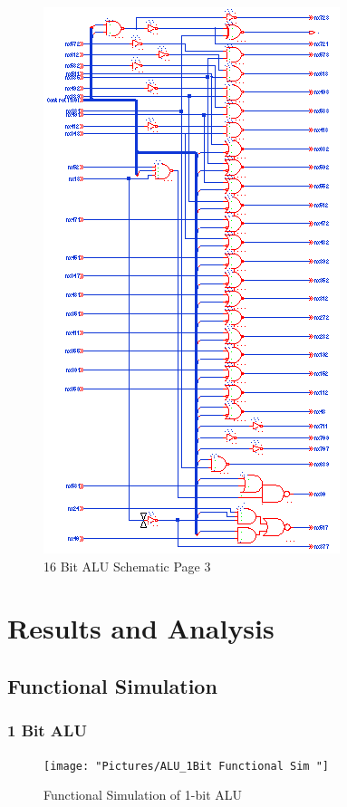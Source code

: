 \documentclass[11pt]{article}
\begin{document}
		\begin{figure}[H]
			\centering
			\includegraphics[width=0.7\linewidth]{"Pictures/ALU-16Bit Schematic 3"}
			\caption{16 Bit ALU Schematic Page 3}
			\label{fig:alu-16bit-schematic-3}
		\end{figure}


\section{Results and Analysis}

	\subsection{Functional Simulation}
	
		\subsubsection{1 Bit ALU}
		
			\begin{figure}[H]
				\centering
				\texttt{[image: "Pictures/ALU\_1Bit Functional Sim "]}
				\caption{Functional Simulation of 1-bit ALU}
				\label{fig:alu1bit-functional-sim-}
			\end{figure}
		
\end{document}
